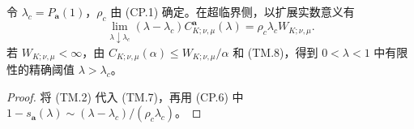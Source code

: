 \begin{corollary}[双测度临界极点]\label{cor:two-measure-pole}
令 $\lambda_c=P_{\boldsymbol a}(1)$，$\rho_c$ 由 (CP.1) 确定。在超临界侧，以扩展实数意义有
\[
 \lim_{\lambda\downarrow\lambda_c}(\lambda-\lambda_c)
 C^{\boldsymbol a}_{K;\nu,\mu}(\lambda)
 =\rho_c\lambda_c W_{K;\nu,\mu}.
\]
若 $W_{K;\nu,\mu}<\infty$，由 $C_{K;\nu,\mu}(\alpha)\le W_{K;\nu,\mu}/\alpha$ 和 (TM.8)，得到 $0<\lambda<1$ 中有限性的精确阈值 $\lambda>\lambda_c$。
\end{corollary}
\begin{proof}
将 (TM.2) 代入 (TM.7)，再用 (CP.6) 中
$1-s_{\boldsymbol a}(\lambda)\sim
(\lambda-\lambda_c)/(\rho_c\lambda_c)$。
\end{proof}

